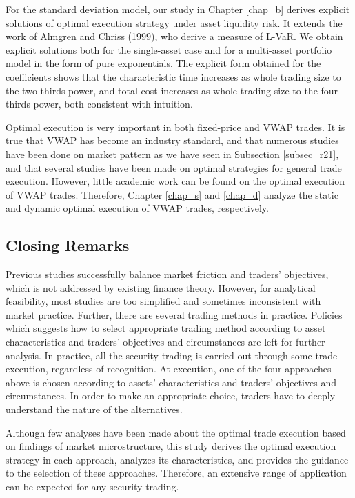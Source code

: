 For the standard deviation model, our study in Chapter \ref{chap_b} derives explicit solutions of optimal execution strategy under asset liquidity risk.  It extends the work of Almgren and Chriss (1999), who derive a measure of L-VaR.  We obtain explicit solutions both for the single-asset case and for a multi-asset portfolio model in the form of pure exponentials.  The explicit form obtained for the coefficients shows that the characteristic time increases as whole trading size to the two-thirds power, and total cost increases as whole trading size to the four-thirds power, both consistent with intuition.

Optimal execution is very important in both fixed-price and VWAP trades.  It is true that VWAP has become an industry standard, and that numerous studies have been done on market pattern as we have seen in Subsection \ref{subsec_r21}, and that several studies have been made on optimal strategies for general trade execution.  However, little academic work can be found on the optimal execution of VWAP trades.  Therefore, Chapter \ref{chap_s} and \ref{chap_d} analyze the static and dynamic optimal execution of VWAP trades, respectively.

\subsection{Closing Remarks}\label{subsec_r34}
Previous studies successfully balance market friction and traders' objectives, which is not addressed by existing finance theory.  However, for analytical feasibility, most studies are too simplified and sometimes inconsistent with market practice.  Further, there are several trading methods in practice.  Policies which suggests how to select appropriate trading method according to asset characteristics and traders' objectives and circumstances are left for further analysis.
In practice, all the security trading is carried out through some trade execution, regardless of recognition.  At execution, one of the four approaches above is chosen according to assets' characteristics and traders' objectives and circumstances.  In order to make an appropriate choice, traders have to deeply understand the nature of the alternatives.  

Although few analyses have been made about the optimal trade execution based on findings of market microstructure, this study derives the optimal execution strategy in each approach, analyzes its characteristics, and provides the guidance to the selection of these approaches.  Therefore, an extensive range of application can be expected for any security trading.

